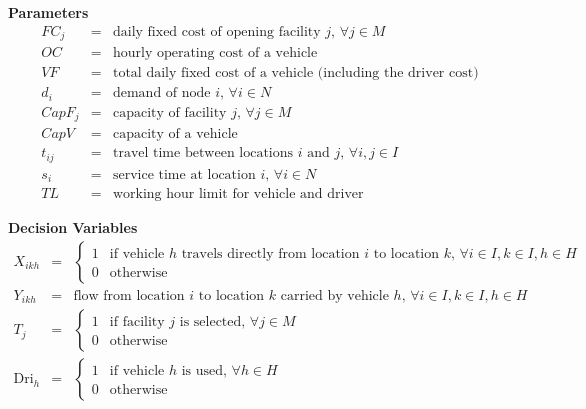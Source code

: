{\bf Parameters}
\begin{eqnarray*}
FC_j & = & \mbox{daily fixed cost of opening facility $j$, $\forall j \in M$} \\
OC & = & \mbox{hourly operating cost of a vehicle} \\
VF & = & \mbox{total daily fixed cost of a vehicle (including the driver cost)} \\
d_i & = & \mbox{demand of node $i$, $\forall i \in N$} \\
CapF_j & = & \mbox{capacity of facility $j$, $\forall j \in M$} \\
CapV & = & \mbox{capacity of a vehicle} \\
t_{ij} & = & \mbox{travel time between locations $i$ and $j$, $\forall i,j \in I$} \\
s_{i} & = & \mbox{service time at location $i$, $\forall i \in N$} \\
TL & = & \mbox{working hour limit for vehicle and driver}
\end{eqnarray*}

{\bf Decision Variables}
\begin{eqnarray*}
X_{ikh} & = & \left\{ \begin{array}{ll}
                 1  & \mbox{if vehicle $h$ travels directly from location $i$ to location $k$, $\forall i \in I, k \in I, h \in H$}\\
                 0  & \mbox{otherwise}                                                  
                \end{array} 
              \right. \\
Y_{ikh} & = & \mbox{flow from location $i$ to location $k$ carried by vehicle $h$, $\forall i \in I, k \in I, h \in H$} \\
T_{j} & = & \left\{ \begin{array}{ll}
                 1  & \mbox{if facility $j$ is selected, $\forall j \in M$}\\
                 0  & \mbox{otherwise}                                                  
                \end{array}  
              \right. \\
\mbox{Dri}_{h} & = &\left \{ \begin{array}{ll}
                 1  & \mbox{if vehicle $h$ is used, $\forall h \in H$}\\
                 0  & \mbox{otherwise}                                                  
                \end{array}  \right. 
\end{eqnarray*}

